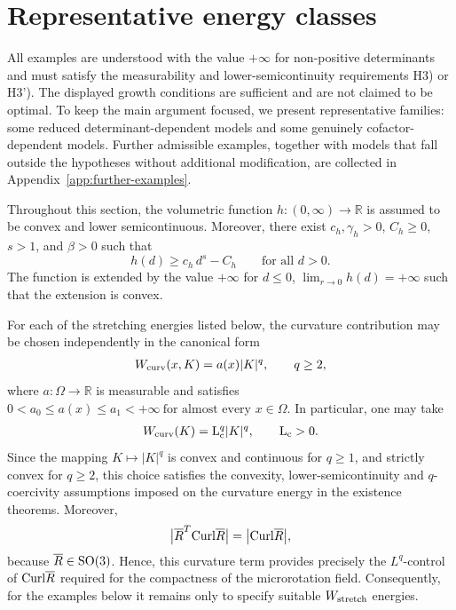 \documentclass[11pt]{article}
\newcommand{\Curl}{{\rm Curl}}
\begin{document}
\section{Representative energy classes}\label{s6}\setcounter{equation}{0}

All examples are understood with the value $+\infty$ for non-positive determinants and must satisfy the measurability and lower-semicontinuity requirements H3) or H3'). The displayed growth conditions are sufficient and are not claimed to be optimal. To keep the main argument focused, we present representative families: some reduced determinant-dependent models and some genuinely cofactor-dependent models. Further admissible examples, together with models that fall outside the hypotheses without additional modification, are collected in Appendix~\ref{app:further-examples}.


Throughout this section, the volumetric function
$
h:(0,\infty)\to\mathbb R
$
is assumed to be convex and lower semicontinuous. Moreover, there exist
$c_h,\gamma_h>0$, $C_h\geq0$, $s>1$, and $\beta>0$ such that
\[
h(d)
\geq
c_h \,d^s-C_h
\qquad\text{for all }d>0.
\]
The function is extended by the value $+\infty$ for $d\leq0$, $\lim _{r\to 0} h(d)=+\infty$ such that the extension is convex. 




For each of the stretching energies listed below, the curvature contribution may be chosen independently in the canonical form
\begin{align}
W_{\rm curv}(x,K)
=
a(x)|K|^q,
\qquad q\geq 2,
\end{align}
where $a:\Omega\to\mathbb R$ is measurable and satisfies
$
0<a_0\leq a(x)\leq a_1<+\infty
\ \text{for almost every }x\in\Omega.
$
In particular, one may take
\begin{align}
W_{\rm curv}(K)
=
{\rm L}_{\rm c}^{q}|K|^q,
\qquad {\rm L}_{\rm c}>0.
\end{align}
Since the mapping
$
K\longmapsto |K|^q
$
is convex and continuous for $q\geq1$, and strictly convex for $q\geq 2$, this choice satisfies the convexity, lower-semicontinuity and $q$-coercivity assumptions imposed on the curvature energy in the existence theorems. Moreover,
\begin{align}
\bigl| \overline R ^T\Curl \overline R \bigr|
=
\bigl|\Curl \overline R \bigr|,
\end{align}
because $ \overline R \in{\rm SO}(3)$. Hence, this curvature term provides precisely the $L^q$-control of $\Curl \overline R $ required for the compactness of the microrotation field. Consequently, for the examples below it remains only to specify suitable $W_{\rm stretch}$ energies.
\end{document}
